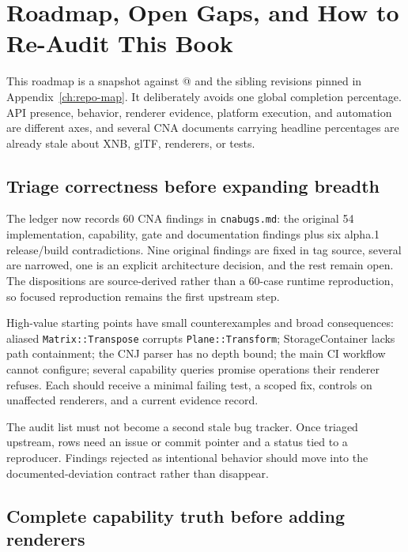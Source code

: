 \chapter{Roadmap, Open Gaps, and How to Re-Audit This Book}
\label{ch:roadmap}

This roadmap is a snapshot against \CnaEditionTag{} @ \CnaRevisionShort{} and the sibling
revisions pinned in Appendix~\ref{ch:repo-map}. It deliberately avoids one global completion
percentage. API presence, behavior,
renderer evidence, platform execution, and automation are different axes, and several CNA
documents carrying headline percentages are already stale about XNB, glTF, renderers, or tests.

\section{Triage correctness before expanding breadth}

The ledger now records 60 CNA findings in \texttt{cnabugs.md}: the original 54 implementation,
capability, gate and documentation findings plus six alpha.1 release/build contradictions.
Nine original findings are fixed in tag source, several are narrowed, one is an explicit
architecture decision, and the rest remain open.  The dispositions are source-derived rather
than a 60-case runtime reproduction, so focused reproduction remains the first upstream step.

High-value starting points have small counterexamples and broad consequences: aliased
\texttt{Matrix::Transpose} corrupts \texttt{Plane::Transform}; StorageContainer lacks path
containment; the CNJ parser has no depth bound; the main CI workflow cannot configure; several
capability queries promise operations their renderer refuses.  Each should receive a minimal
failing test, a scoped fix, controls on unaffected renderers, and a current evidence record.

The audit list must not become a second stale bug tracker.  Once triaged upstream, rows need an
issue or commit pointer and a status tied to a reproducer.  Findings rejected as intentional
behavior should move into the documented-deviation contract rather than disappear.

\section{Complete capability truth before adding renderers}

